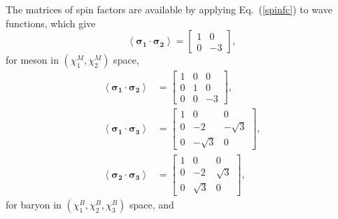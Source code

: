\documentclass[prd,twocolumn,floatfix,nofootinbib]{revtex4}
\begin{document}
The matrices of spin factors are available by applying Eq.~(\ref{spinfc}) to wave functions, which give
\begin{equation}\label{sfcM}
    \left\langle \boldsymbol{\sigma_{1}}\cdot \boldsymbol{\sigma_{2}} \right\rangle=
    \begin{bmatrix}
        1 & 0 \\
        0 & -3
    \end{bmatrix},
\end{equation}
for meson in $(\chi_{1}^{M},\chi_{2}^{M})$ space,
    \begin{align}
        \left\langle \boldsymbol{\sigma_{1}}\cdot \boldsymbol{\sigma_{2}} \right\rangle&=
        \begin{bmatrix}
            1 & 0 & 0 \\
            0 & 1 & 0 \\
            0 & 0 & -3
        \end{bmatrix}, \\
        \left\langle \boldsymbol{\sigma_{1}}\cdot \boldsymbol{\sigma_{3}} \right\rangle&=
        \begin{bmatrix}
            1 & 0 & 0 \\
            0 & -2 & -\sqrt{3} \\
            0 & -\sqrt{3} & 0
        \end{bmatrix}, \\
        \left\langle \boldsymbol{\sigma_{2}}\cdot \boldsymbol{\sigma_{3}} \right\rangle&=
        \begin{bmatrix}
            1 & 0 & 0 \\
            0 & -2 & \sqrt{3} \\
            0 & \sqrt{3} & 0
        \end{bmatrix},
    \end{align}
for baryon in $(\chi_{1}^{B},\chi_{2}^{B},\chi_{3}^{B})$ space, and
\end{document}
